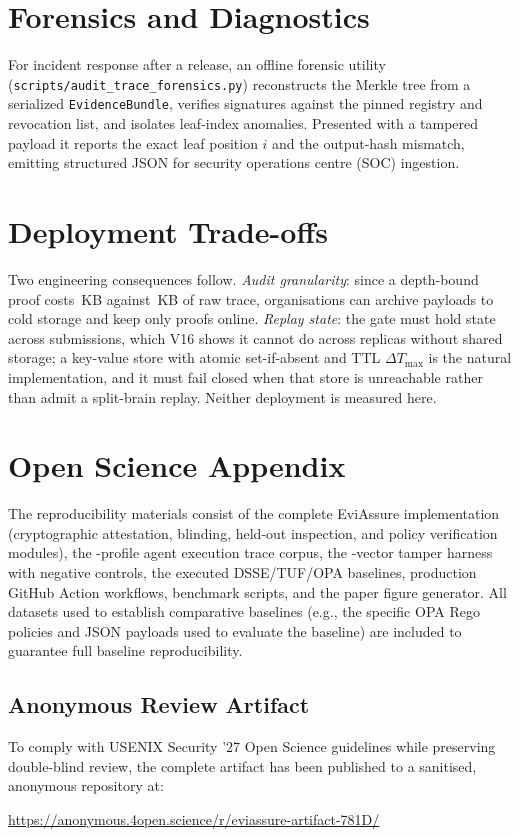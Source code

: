\documentclass[letterpaper,10pt,twocolumn]{article}
\theoremstyle{definition}
\begin{document}
\section{Forensics and Diagnostics}\label{sec:forensics}
For incident response after a release, an offline forensic utility (\nolinkurl{scripts/audit_trace_forensics.py}) reconstructs the Merkle tree from a serialized \texttt{EvidenceBundle}, verifies signatures against the pinned registry and revocation list, and isolates leaf-index anomalies. Presented with a tampered payload it reports the exact leaf position $i$ and the output-hash mismatch, emitting structured JSON for security operations centre (SOC) ingestion.

\section{Deployment Trade-offs}\label{sec:tradeoffs}
Two engineering consequences follow. \emph{Audit granularity}: since a depth-bound proof costs \sparseProofSizeKb{}\,KB against \rawSizeOneMKb{}\,KB of raw trace, organisations can archive payloads to cold storage and keep only proofs online. \emph{Replay state}: the gate must hold state across submissions, which V16 shows it cannot do across replicas without shared storage; a key-value store with atomic set-if-absent and TTL $\Delta T_{\text{max}}$ is the natural implementation, and it must fail closed when that store is unreachable rather than admit a split-brain replay. Neither deployment is measured here.

\section{Open Science Appendix}\label{sec:appendix_open_science}
The reproducibility materials consist of the complete EviAssure implementation (cryptographic attestation, blinding, held-out inspection, and policy verification modules), the \corpusProfiles{}-profile agent execution trace corpus, the \scoredVectors{}-vector tamper harness with negative controls, the executed DSSE/TUF/OPA baselines, production GitHub Action workflows, benchmark scripts, and the paper figure generator. All datasets used to establish comparative baselines (e.g., the specific OPA Rego policies and JSON payloads used to evaluate the baseline) are included to guarantee full baseline reproducibility.

\subsection{Anonymous Review Artifact}
To comply with USENIX Security '27 Open Science guidelines while preserving double-blind review, the complete artifact has been published to a sanitised, anonymous repository at:
\begin{center}
\url{https://anonymous.4open.science/r/eviassure-artifact-781D/}
\end{center}
\end{document}
